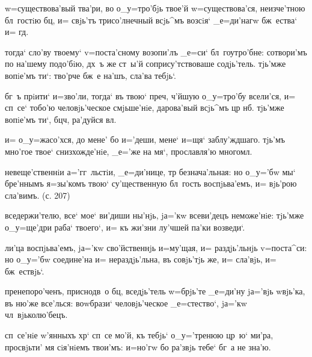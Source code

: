 w=существова'вый тва'ри, во о_у=тро'бjь твое'й 
w=существова'ся, неизче'тною бл~гостiю бц, и= свjь'тъ 
трисо'лнечный всjь^мъ возсiя` _е=ди'нагw бж~ества` и= 
гд.



тогда` сло'ву твоему` v=поста'сному возопи'лъ _е=си` 
бл~гоутро'бне: сотвори'мъ по на'шему подо'бiю, дх~ъ же 
ст~ы'й сопрису'тствоваше содjь'тель. тjь'мже вопiе'мъ 
ти`: тво'рче бж~е на'шъ, сла'ва тебjь`.

бг~ъ прiити` и=зво'ли, тогда` въ твою` преч, 
ч'йшую о_у=тро'бу всели'ся, и= сп~се` тобо'ю 
человjь'ческое смjьше'нiе, дарова'вый всjь^мъ цр 
нб. тjь'мже вопiе'мъ ти`, бц ч, ра'дуйся 
вл.


и= о_у=жасо'хся, до мене' бо и='деши, мене` и=щя` 
заблу'ждшаго. тjь'мъ мно'гое твое` снизхожде'нiе, _е='же 
на мя`, прославля'ю многомл.

невеще'ственнiи а='гг~льстiи, _е=ди'нице, тр 
безнача'льная: но о_у='бw мы` бре'ннымъ я=зы'комъ твою` 
су'щественную бл~гость воспjьва'емъ, и= вjь'рою сла'вимъ. 
(с. 207)

вседержи'телю, все` мое` ви'диши ны'нjь, jа='кw 
всеви'децъ неможе'нiе: тjь'мже о_у=ще'дри раба` твоего`, 
и= къ жи'зни лу'чшей па'ки возведи`.

ли'ца воспjьва'емъ, jа='кw сво'йственнjь и=му'щая, и= 
раздjь'льнjь v=поста^си: но о_у='бw соедине'на и= 
нераздjь'льна, въ совjь'тjь же, и= сла'вjь, и= 
бж~ествjь`.

пренепоро'ченъ, приснодв~о бц, вседjь'тель w=брjь'те 
_е=ди'ну jа='вjь w\т вjь'ка, въ ню'же все'лься: воwбрази` 
человjь'ческое _е=стество`, jа='кw чл~вjьколю'бецъ.


сп~се'нiе w'янныхъ хр` сп~се мо'й, къ тебjь` 
о_у='тренюю цр~ю` ми'ра, просвjьти' мя сiя'нiемъ твои'мъ: 
и=но'гw бо ра'звjь тебе` бг~а не зна'ю.

